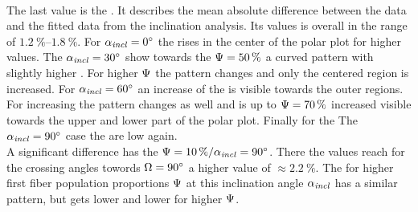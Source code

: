 \paragraph{\rvalue}
The last value is the \rvalue{}.
It describes the mean absolute difference between the data and the fitted data from the inclination analysis.
Its values is overall in the range of $\SIrange{1.2}{1.8}{\percent}$.
For $\textnormal{$\alpha_{\mathit{incl}}$} = \SI{0}{\degree}$ the \rvalue{} rises in the center of the polar plot for higher \modelPsi{} values.
The $\textnormal{$\alpha_{\mathit{incl}}$} = \SI{30}{\degree}$ show towards the $\textnormal{$\Psi$} = \SI{50}{\percent}$ a curved pattern with slightly higher \rvalue{}.
For higher $\textnormal{$\Psi$}$ the pattern changes and only the centered region is increased.
For $\textnormal{$\alpha_{\mathit{incl}}$} = \SI{60}{\degree}$ an increase of the \rvalue{} is visible towards the outer regions.
For increasing \modelInc{} the pattern changes as well and is up to $\textnormal{$\Psi$}=\SI{70}{\percent}$ increased visible towards the upper and lower part of the polar plot.
Finally for the The $\textnormal{$\alpha_{\mathit{incl}}$} = \SI{90}{\degree}$ case the \rvalue{} are low again.
\\
A significant difference has the $\textnormal{$\Psi$} = \SI{10}{\percent} / \textnormal{$\alpha_{\mathit{incl}}$} = \SI{90}{\degree}$.
There the values reach for the crossing angles towords $\textnormal{$\Omega$} = \SI{90}{\degree}$ a higher value of $\approx \SI{2.2}{\percent}$.
The \rvalue{} for higher first fiber population proportions $\textnormal{$\Psi$}$ at this inclination angle $\textnormal{$\alpha_{\mathit{incl}}$}$ has a similar pattern, but gets lower and lower for higher $\textnormal{$\Psi$}$.
% 
% 
% 
% 
